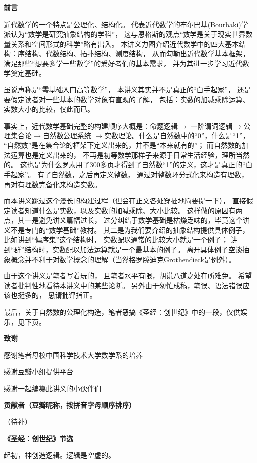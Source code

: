 \textbf{前言}

近代数学的一个特点是公理化、结构化。
代表近代数学的布尔巴基(Bourbaki)学派认为“数学是研究抽象结构的学科”，
这与恩格斯的观点“数学是关于现实世界数量关系和空间形式的科学”略有出入。
本讲义力图介绍近代数学中的四大基本结构：序结构、代数结构、拓扑结构、测度结构，
从而勾勒出近代数学基本框架，满足那些“想要多学一些数学”的爱好者们的基本需求，
并为其进一步学习近代数学奠定基础。

虽说声称是“零基础入门高等数学”，
本讲义其实并不是真正的“白手起家”，
还是要假定读者对一些基本的数学对象有直观的了解，
包括：实数的加减乘除运算、实数大小的比较，仅此而已。

事实上，近代数学基础完整的构建顺序大概是：命题逻辑$\rightarrow$
一阶谓词逻辑$\rightarrow$公理集合论$\rightarrow$自然数公理系统
$\rightarrow$实数理论。什么是自然数中的“0”，什么是“1”，
“自然数”是在集合论的框架下定义出来的，并不是“本来就有的”；
而自然数的加法运算也是定义出来的，
不再是初等数学那样子来源于日常生活经验，理所当然的。
这也是为什么罗素用了300多页才得到了自然数“1”的定义，这才是真正的“白手起家”。
有了自然数，之后再定义整数，
通过对整数环分式化来构造有理数，
再对有理数完备化来构造实数。

而本讲义跳过这个漫长的构建过程（但会在正文各处穿插地简要提一下），
直接假定读者知道什么是实数，以及实数的加减乘除、大小比较。
这样做的原因有两点，其一是避免讲义篇幅过长，
过分纠结于数学基础是枯燥乏味的，毕竟这个讲义不是专门的“数学基础”教材。
其二是为我们要介绍的抽象结构提供具体例子，比如讲到“偏序集”这个结构时，
实数配以通常的比较大小就是一个例子；
讲到“群”结构时，实数配以加法运算就是一个最基本的例子。
离开具体例子空谈抽象概念并不利于对数学概念的理解（当然格罗滕迪克Grothendieck是例外）。

由于这个讲义是笔者写着玩的，
且笔者水平有限，胡说八道之处在所难免。
希望读者批判性地看待本讲义中的某些论断。
另外由于匆忙成稿，笔误、语法错误应该也挺多的，
恳请批评指正。

最后，关于自然数的公理化构造，笔者恶搞《圣经：创世纪》中的一段，仅供娱乐，见下页。
\vspp\vspp

\textbf{致谢}

感谢笔者母校中国科学技术大学数学系的培养

感谢豆瓣小组提供平台

感谢一起编纂此讲义的小伙伴们

\vspp
\textbf{贡献者（豆瓣昵称，按拼音字母顺序排序）}

（待补）

\newpage
\textbf{《圣经：创世纪》节选}

起初，神创造逻辑。逻辑是空虚的。

